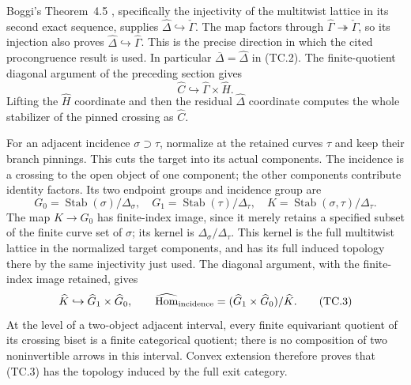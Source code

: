 Boggi's Theorem~4.5 \cite{ET_Boggi2014}, specifically the injectivity of the multitwist
lattice in its second exact sequence, supplies
$\widehat\Delta\hookrightarrow\check\Gamma$.
The map factors through $\widehat\Gamma\twoheadrightarrow
\check\Gamma$, so its injection also proves
$\widehat\Delta\hookrightarrow\widehat\Gamma$.
This is the precise direction in which the cited procongruence result
is used.  In particular $\overline\Delta=\widehat\Delta$ in (TC.2).
The finite-quotient diagonal argument of the preceding section gives
\[
        \widehat C\hookrightarrow\widehat\Gamma\times\widehat H.
\]
Lifting the $\widehat H$ coordinate and then the residual
$\widehat\Delta$ coordinate computes the whole stabilizer of the
pinned crossing as $\widehat C$.

For an adjacent incidence $\sigma\supset\tau$, normalize at the
retained curves $\tau$ and keep their branch pinnings.  This cuts the
target into its actual components.  The incidence is a crossing to
the open object of one component; the other components contribute
identity factors.  Its two endpoint groups and incidence group are
\[
 G_0=\operatorname{Stab}(\sigma)/\Delta_\sigma,
 \quad G_1=\operatorname{Stab}(\tau)/\Delta_\tau,
 \quad K=\operatorname{Stab}(\sigma,\tau)/\Delta_\tau.
\]
The map $K\to G_0$ has finite-index image, since it merely retains
a specified subset of the finite curve set of $\sigma$; its kernel is
$\Delta_\sigma/\Delta_\tau$.  This kernel is the full multitwist
lattice in the normalized target components, and has its full induced
topology there by the same injectivity just used.  The diagonal argument,
with the finite-index image retained, gives
\[
 \widehat K\hookrightarrow\widehat G_1\times\widehat G_0,
 \qquad
 \widehat{\operatorname{Hom}}_{\rm incidence}
     = (\widehat G_1\times\widehat G_0)/\widehat K.          \tag{TC.3}
\]
At the level of a two-object adjacent interval, every finite equivariant
quotient of its crossing biset is a finite categorical quotient;
there is no composition of two noninvertible arrows in this interval.
Convex extension therefore proves that (TC.3) has the topology induced
by the full exit category.

